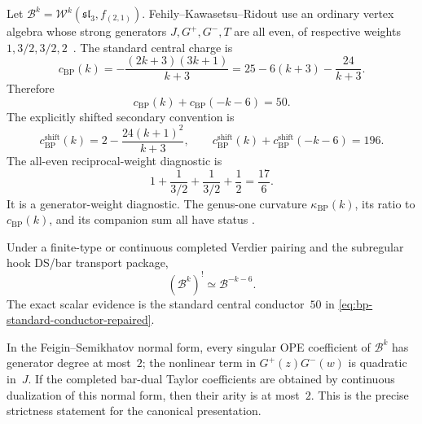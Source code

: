 Let
$\mathcal B^k=\mathcal W^k(\mathfrak{sl}_3,f_{(2,1)})$.
Fehily--Kawasetsu--Ridout use an ordinary vertex algebra whose strong
generators $J,G^+,G^-,T$ are all even, of respective weights
$1,3/2,3/2,2$~\cite[Definition~2.1]{FKR20}.  The standard central
charge is
\begin{equation}\label{eq:bp-standard-central-repaired}
c_{\mathrm{BP}}(k)
=-\frac{(2k+3)(3k+1)}{k+3}
=25-6(k+3)-\frac{24}{k+3}.
\end{equation}
Therefore
\begin{equation}\label{eq:bp-standard-conductor-repaired}
c_{\mathrm{BP}}(k)+c_{\mathrm{BP}}(-k-6)=50.
\end{equation}
The explicitly shifted secondary convention is
\begin{equation}\label{eq:bp-shifted-central-repaired}
c_{\mathrm{BP}}^{\mathrm{shift}}(k)
=2-\frac{24(k+1)^2}{k+3},
\qquad
c_{\mathrm{BP}}^{\mathrm{shift}}(k)
+c_{\mathrm{BP}}^{\mathrm{shift}}(-k-6)=196.
\end{equation}
The all-even reciprocal-weight diagnostic is
\begin{equation}\label{eq:bp-reciprocal-weight-diagnostic}
1+\frac{1}{3/2}+\frac{1}{3/2}+\frac12=\frac{17}{6}.
\end{equation}
It is a generator-weight diagnostic.  The genus-one curvature
$\kappa_{\mathrm{BP}}(k)$, its ratio to $c_{\mathrm{BP}}(k)$, and its
companion sum all have status \ClaimStatusOpen.

\begin{conjecture}
\label{conj:bp-duality}
Under a finite-type or continuous completed Verdier pairing and the
subregular hook DS/bar transport package,
\[
(\mathcal B^k)^!\simeq\mathcal B^{-k-6}.
\]
The exact scalar evidence is the standard central conductor~$50$ in
\eqref{eq:bp-standard-conductor-repaired}.
\end{conjecture}

\begin{theorem}
\label{thm:w-bp-strict}
In the Feigin--Semikhatov normal form, every singular OPE coefficient
of $\mathcal B^k$ has generator degree at most~$2$; the nonlinear
term in $G^+(z)G^-(w)$ is quadratic in~$J$.  If the completed
bar-dual Taylor coefficients are obtained by continuous dualization
of this normal form, then their arity is at most~$2$.  This is the
precise strictness statement for the canonical presentation.
\end{theorem}

